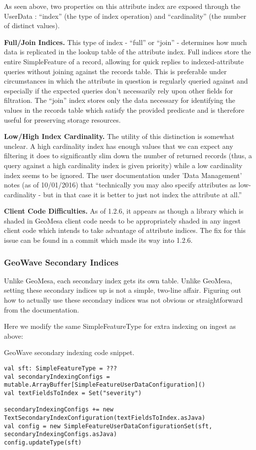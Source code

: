 As seen above, two properties on this attribute index are exposed through the UserData : ``index'' (the type of index operation) and ``cardinality'' (the number of distinct values).

{\bf Full/Join Indices.}
This type of index - ``full'' or ``join'' - determines how much data is replicated in the lookup table of the attribute index.
Full indices store the entire SimpleFeature of a record, allowing for quick replies to indexed-attribute queries without joining against the records table.
This is preferable under circumstances in which the attribute in question is regularly queried against and especially if the expected queries don't necessarily rely upon other fields for filtration.
The ``join'' index stores only the data necessary for identifying the values in the records table which satisfy the provided predicate and is therefore useful for preserving storage resources.

{\bf Low/High Index Cardinality.}
The utility of this distinction is somewhat unclear.
A high cardinality index has enough values that we can expect any filtering it does to significantly slim down the number of returned records (thus, a query against a high cardinality index is given priority) while a low cardinality index seems to be ignored.
The user documentation under 'Data Management' notes (as of 10/01/2016) that ``technically you may also specify attributes as low-cardinality - but in that case it is better to just not index the attribute at all.''

{\bf Client Code Difficulties.}
As of 1.2.6, it appears as though a library which is shaded in GeoMesa client code needs to be appropriately shaded in any ingest client code which intends to take advantage of attribute indices.
The fix for this issue can be found in a commit which made its way into 1.2.6.

\subsubsection{GeoWave Secondary Indices}
  
Unlike GeoMesa, each secondary index gets its own table. Unlike GeoMesa, setting these secondary indices up is not a simple, two-line affair. Figuring out how to actually use these secondary indices was not obvious or straightforward from the documentation.

Here we modify the same SimpleFeatureType for extra indexing on ingest as above:

\begin{algorithm}[htb]
\caption{GeoWave secondary indexing code snippet.}
\footnotesize{\begin{lstlisting}
val sft: SimpleFeatureType = ???
val secondaryIndexingConfigs = mutable.ArrayBuffer[SimpleFeatureUserDataConfiguration]()
val textFieldsToIndex = Set("severity")

secondaryIndexingConfigs += new TextSecondaryIndexConfiguration(textFieldsToIndex.asJava)
val config = new SimpleFeatureUserDataConfigurationSet(sft, secondaryIndexingConfigs.asJava)
config.updateType(sft)
\end{lstlisting}}
\end{algorithm}

